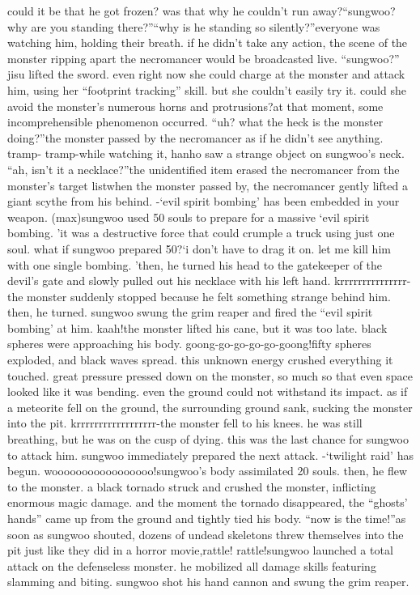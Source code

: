 could it be that he got frozen? was that why he couldn’t run away?“sungwoo? why are you standing there?”“why is he standing so silently?”everyone was watching him, holding their breath.
 if he didn’t take any action, the scene of the monster ripping apart the necromancer would be broadcasted live.
“sungwoo?” jisu lifted the sword.
 even right now she could charge at the monster and attack him, using her “footprint tracking” skill.
 but she couldn’t easily try it.
 could she avoid the monster’s numerous horns and protrusions?at that moment, some incomprehensible phenomenon occurred.
“uh? what the heck is the monster doing?”the monster passed by the necromancer as if he didn’t see anything.
tramp- tramp-while watching it, hanho saw a strange object on sungwoo’s neck.
“ah, isn’t it a necklace?”the unidentified item erased the necromancer from the monster’s target listwhen the monster passed by, the necromancer gently lifted a giant scythe from his behind.
-‘evil spirit bombing’ has been embedded in your weapon.
 (max)sungwoo used 50 souls to prepare for a massive ‘evil spirit bombing.
’it was a destructive force that could crumple a truck using just one soul.
what if sungwoo prepared 50?‘i don’t have to drag it on.
 let me kill him with one single bombing.
’then, he turned his head to the gatekeeper of the devil’s gate and slowly pulled out his necklace with his left hand.
krrrrrrrrrrrrrrr-the monster suddenly stopped because he felt something strange behind him.
 then, he turned.
 sungwoo swung the grim reaper and fired the “evil spirit bombing’ at him.
kaah!the monster lifted his cane, but it was too late.
 black spheres were approaching his body.
goong-go-go-go-go-goong!fifty spheres exploded, and black waves spread.
 this unknown energy crushed everything it touched.
 great pressure pressed down on the monster, so much so that even space looked like it was bending.
even the ground could not withstand its impact.
 as if a meteorite fell on the ground, the surrounding ground sank, sucking the monster into the pit.
krrrrrrrrrrrrrrrrrr-the monster fell to his knees.
 he was still breathing, but he was on the cusp of dying.
 this was the last chance for sungwoo to attack him.
sungwoo immediately prepared the next attack.
-‘twilight raid’ has begun.
wooooooooooooooooo!sungwoo’s body assimilated 20 souls.
 then, he flew to the monster.
 a black tornado struck and crushed the monster, inflicting enormous magic damage.
and the moment the tornado disappeared, the “ghosts’ hands” came up from the ground and tightly tied his body.
“now is the time!”as soon as sungwoo shouted, dozens of undead skeletons threw themselves into the pit just like they did in a horror movie,rattle! rattle!sungwoo launched a total attack on the defenseless monster.
 he mobilized all damage skills featuring slamming and biting.
sungwoo shot his hand cannon and swung the grim reaper.


